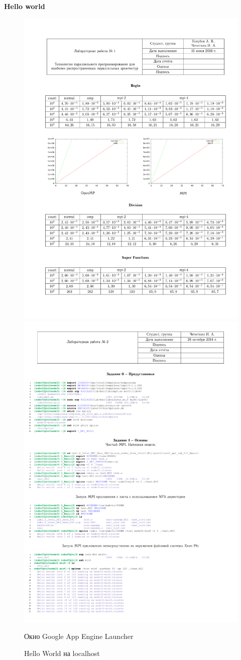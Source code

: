 \documentclass[pscyr,10pt]{hedlab}
\begin{document}
  \newpage  
  \begin{center}
    \textbf{Hello world}
  \end{center}
  
  \begin{figure}[h!]
    \center
    \includegraphics[width=.47\textwidth]{01} \hfill
    \includegraphics[width=.47\textwidth]{02}
    \parbox{.47\textwidth}{\center Окно Google App Engine Launcher} \hfill
    \parbox{.47\textwidth}{\center Hello World на localhost}
  \end{figure}
  
\end{document}
